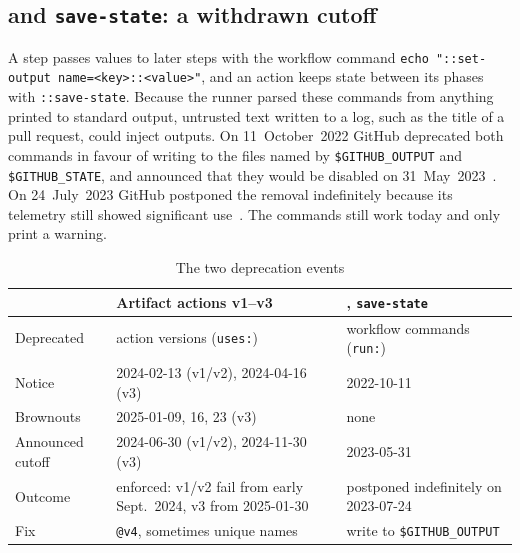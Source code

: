 \subsection{\so{} and \texttt{save-state}: a withdrawn cutoff}
A step passes values to later steps with the workflow command \texttt{echo "::set-output name=<key>::<value>"}, and an action keeps state between its phases with \texttt{::save-state}.
Because the runner parsed these commands from anything printed to standard output, untrusted text written to a log, such as the title of a pull request, could inject outputs.
On 11~October~2022 GitHub deprecated both commands in favour of writing to the files named by \texttt{\$GITHUB\_OUTPUT} and \texttt{\$GITHUB\_STATE}, and announced that they would be disabled on 31~May~2023~\cite{gh-setoutput-deprecation}.
On 24~July~2023 GitHub postponed the removal indefinitely because its telemetry still showed significant use~\cite{gh-setoutput-deprecation}.
The commands still work today and only print a warning.

\begin{table}[t]
\caption{The two deprecation events}\label{tab:events}
\centering\footnotesize
\begin{tabular}{@{}L{0.17\columnwidth}L{0.37\columnwidth}L{0.36\columnwidth}@{}}
\toprule
 & \textbf{Artifact actions v1--v3} & \textbf{\so{}, \texttt{save-state}} \\
\midrule
Deprecated & action versions (\texttt{uses:}) & workflow commands (\texttt{run:}) \\
Notice & 2024-02-13 (v1/v2), 2024-04-16 (v3) & 2022-10-11 \\
Brownouts & 2025-01-09, 16, 23 (v3) & none \\
Announced cutoff & 2024-06-30 (v1/v2), 2024-11-30 (v3) & 2023-05-31 \\
Outcome & enforced: v1/v2 fail from early Sept.\ 2024, v3 from 2025-01-30 & postponed indefinitely on 2023-07-24 \\
Fix & \texttt{@v4}, sometimes unique names & write to \texttt{\$GITHUB\_OUTPUT} \\
\bottomrule
\end{tabular}
\end{table}
